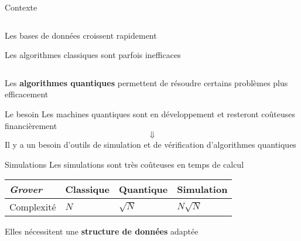 \begin{frame}{Contexte}

\begin{center}
  \begin{columns}
    \begin{column}{0.5\textwidth}
      Les  bases de données croissent rapidement

      \vspace{1em}
      Les algorithmes classiques sont parfois inefficaces
    \end{column}
    \begin{column}{0.5\textwidth}
    \end{column}
    \let\thefootnote\relax{}
  \end{columns}


  \pause
  Les \textbf{algorithmes quantiques} permettent de résoudre certains problèmes plus efficacement
  \end{center}
\end{frame}

\begin{frame}{Le besoin}
  Les machines quantiques sont en développement et resteront coûteuses financièrement
  $$\Downarrow$$
  Il y a un besoin d'outils de simulation et de vérification d'algorithmes quantiques
\end{frame}

\begin{frame}{Simulations}
  Les simulations sont très coûteuses en temps de calcul
  \begin{table}[]
    \begin{tabular}{l|l|l|l}
        \textit{Grover} & Classique & Quantique & Simulation    \\ \hline \rule{0pt}{2.6ex}
    Complexité & $N$       & $\sqrt N$ & {\color{red}$N \sqrt N$}
    \end{tabular}
  \end{table}

  \vspace{1em}

  Elles nécessitent une \textbf{structure de données} adaptée
\end{frame}